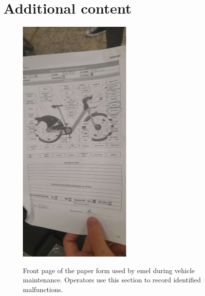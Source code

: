 \chapter{Additional content}


\begin{figure}[htbp]
  \caption{Front page of the paper form used by \ac{emel} during vehicle maintenance. Operators use this section to record identified malfunctions.}
  \centering
  \includegraphics[width=0.50\textwidth]{figs/chapter2/emel_front}
  \label{fig:emel_front}
\end{figure}

